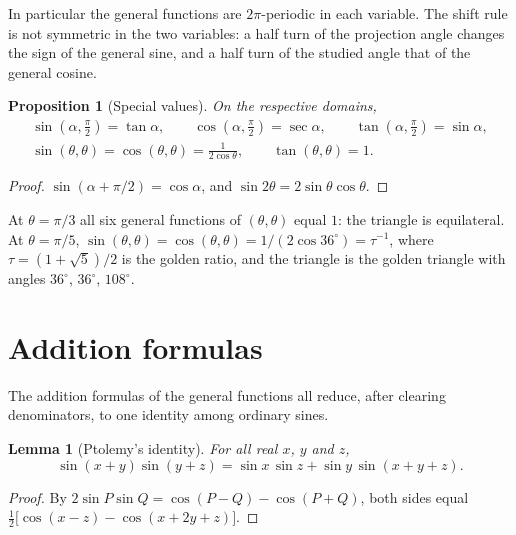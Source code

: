 \documentclass[11pt]{amsart}
\newtheorem{lem}[thm]{Lemma}
\newtheorem{prop}[thm]{Proposition}
\theoremstyle{definition}
\theoremstyle{remark}
\numberwithin{equation}{section}
\begin{document}
In particular the general functions are $2\pi$-periodic in each variable.
The shift rule is not symmetric in the two variables: a half turn of the
projection angle changes the sign of the general sine, and a half turn of
the studied angle that of the general cosine.

\begin{prop}[Special values]
\label{prop:special}
On the respective domains,
\begin{gather*}
\sin(\alpha,\tfrac{\pi}{2}) = \tan\alpha, \qquad
\cos(\alpha,\tfrac{\pi}{2}) = \sec\alpha, \qquad
\tan(\alpha,\tfrac{\pi}{2}) = \sin\alpha, \\
\sin(\theta,\theta) = \cos(\theta,\theta) = \frac{1}{2\cos\theta}, \qquad
\tan(\theta,\theta) = 1 .
\end{gather*}
\end{prop}

\begin{proof}
$\sin(\alpha+\pi/2) = \cos\alpha$, and $\sin 2\theta = 2\sin\theta\cos\theta$.
\end{proof}

At $\theta = \pi/3$ all six general functions of $(\theta,\theta)$ equal
$1$: the triangle is equilateral. At $\theta = \pi/5$,
$\sin(\theta,\theta) = \cos(\theta,\theta) = 1/(2\cos 36^\circ) = \tau^{-1}$,
where $\tau = (1+\sqrt5)/2$ is the golden ratio, and the triangle is the
golden triangle with angles $36^\circ$, $36^\circ$, $108^\circ$.

\section{Addition formulas}
\label{sec:addition}

The addition formulas of the general functions all reduce, after
clearing denominators, to one identity among ordinary sines.

\begin{lem}[Ptolemy's identity]
\label{lem:ptolemy}
For all real $x$, $y$ and $z$,
\begin{equation}
\label{eq:ptolemy}
\sin(x+y)\sin(y+z) = \sin x\,\sin z + \sin y\,\sin(x+y+z).
\end{equation}
\end{lem}

\begin{proof}
By $2\sin P\sin Q = \cos(P-Q) - \cos(P+Q)$, both sides equal
$\tfrac12\bigl[\cos(x-z) - \cos(x+2y+z)\bigr]$.
\end{proof}
\end{document}
